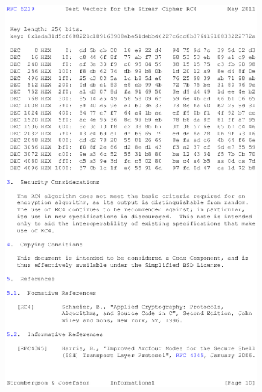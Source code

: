 \begin{anexosenv}
\begin{figure}
\centering
\includegraphics{figuras/file-9}
\end{figure}


\end{anexosenv}
